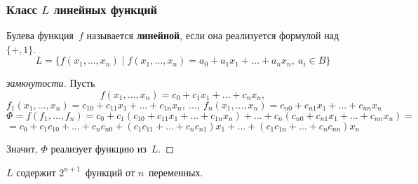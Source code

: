 \subsubsection{Класс \texorpdfstring{$L$}{} линейных функций}
 Булева функция~$f$ называется \textbf{линейной}, если она реализуется формулой над~$\{ +, 1 \}$.
\begin{equation*}
L = \{ f(x_1, \ldots, x_n) \mid
f(x_1, \ldots, x_n) = a_0 + a_1 x_1 + \ldots + a_n x_n, \ a_i \in B \}
\end{equation*}
\begin{proof}[замкнутости]
Пусть
\begin{equation*}
f(x_1, \ldots, x_n) = c_0 + c_1 x_1 + \ldots + c_n x_n,
\end{equation*}
\begin{equation*}
f_1(x_1, \ldots, x_n) = c_{10} + c_{11} x_1 + \ldots + c_{1n} x_n, \ \ldots, \
f_n(x_1, \ldots, x_n) = c_{n0} + c_{n1} x_1 + \ldots + c_{nn} x_n
\end{equation*}
\begin{equation*}
\Phi
= f(f_1, \ldots, f_n) =
c_0 + c_1(c_{10} + c_{11} x_1 + \ldots + c_{1n} x_n) + \ldots + c_n(c_{n0} + c_{n1} x_1 + \ldots + c_{nn} x_n) =
\end{equation*}
\begin{equation*}
= c_0 + c_1 c_{10} + \ldots + c_n c_{n0} + (c_1 c_{11} + \ldots + c_n c_{n1}) x_1 + \ldots + (c_1 c_{1n} + \ldots + c_n c_{nn}) x_n
\end{equation*}

Значит, $\Phi$ реализует функцию из~$L$.
\end{proof}

$L$ содержит $2^{n+1}$~функций от $n$~переменных.

